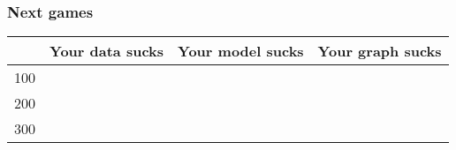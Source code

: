 \documentclass[xcolor=table,dvipsnames]{beamer}
\begin{document}
\begin{frame}
\frametitle{Next games}
\begin{table}[H]\centering
{\color{white} \begin{tabular}{|r|c|c|c|} \hline
\rowcolor{jeopardy} & Your data sucks & Your model sucks & Your graph sucks \\\hline
\rowcolor{jeopardy} 100 & & & \\\hline
\rowcolor{jeopardy} 200 & & & \\\hline
\rowcolor{jeopardy} 300 & &	& \\\hline
\end{tabular}}
\end{table}

\end{frame}	
\end{document}
